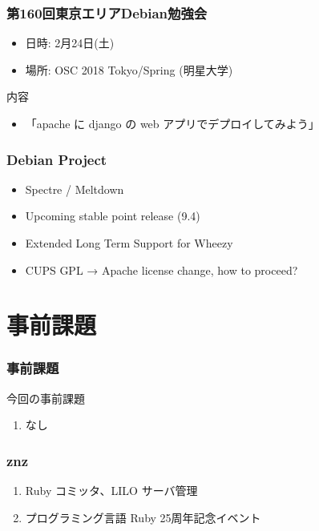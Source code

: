 \documentclass[cjk,dvipdfmx,10pt,compress,%
hyperref={bookmarks=true,bookmarksnumbered=true,bookmarksopen=false,%
colorlinks=false,%
pdftitle={第 132 回 関西 Debian 勉強会},%
pdfauthor={かわだ},%
pdfsubject={資料},%
}]{beamer}
\begin{document}
\begin{frame}[fragile]
  \frametitle{第160回東京エリアDebian勉強会}
  \begin{itemize}
  \item 日時: 2月24日(土)
  \item 場所: OSC 2018 Tokyo/Spring (明星大学)
  \end{itemize}
  \begin{block}{内容}
    \begin{itemize}
    \item 「apache に django の web アプリでデプロイしてみよう」
    \end{itemize}
  \end{block}
\end{frame}

\begin{frame}[fragile]
  \frametitle{Debian Project}
  \begin{itemize}
  \item Spectre / Meltdown
  \item Upcoming stable point release (9.4)
  \item Extended Long Term Support for Wheezy
  \item CUPS GPL → Apache license change, how to proceed?
  \end{itemize}
\end{frame}


\section{事前課題}

\begin{frame}[fragile]
  \frametitle{事前課題}
  \begin{block}{今回の事前課題}
    \begin{enumerate}
    \item なし
    \end{enumerate}
  \end{block}
\end{frame}


\begin{frame}
  \frametitle{ znz }
  \begin{enumerate}
  \item Ruby コミッタ、LILO サーバ管理
  \item プログラミング言語 Ruby 25周年記念イベント
  \end{enumerate}
\end{frame}
\end{document}
